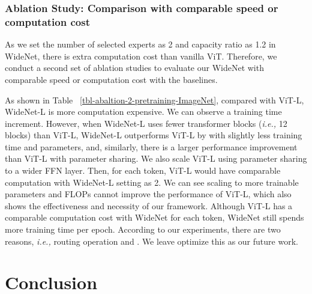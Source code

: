 \documentclass[letterpaper]{article} \usepackage{aaai22}  \usepackage{times}  \usepackage{helvet}  \usepackage{courier}  \usepackage[hyphens]{url}  \usepackage{graphicx} \urlstyle{rm} \def\UrlFont{\rm}  \usepackage{natbib}  \usepackage{caption} \DeclareCaptionStyle{ruled}{labelfont=normalfont,labelsep=colon,strut=off} \frenchspacing  \setlength{\pdfpagewidth}{8.5in}  \setlength{\pdfpageheight}{11in}  \usepackage{algorithm}
\newcommand{\ie}{\emph{i.e.,}\xspace}
\begin{document}
\subsubsection{Ablation Study: Comparison with comparable speed or computation cost}
As we set the number of selected experts  as 2 and capacity ratio  as 1.2 in WideNet, there is extra computation cost than vanilla ViT. Therefore, we conduct a second set of ablation studies to evaluate our WideNet with comparable speed or computation cost with the baselines.  

As shown in Table ~\ref{tbl-abaltion-2-pretraining-ImageNet}, compared with ViT-L, WideNet-L is more computation expensive. We can observe a training time increment. However, when WideNet-L uses fewer transformer blocks (\ie 12 blocks) than ViT-L, WideNet-L outperforms ViT-L by  with slightly less training time and  parameters, and, similarly, there is a larger performance improvement than ViT-L with parameter sharing. We also scale ViT-L using parameter sharing to a wider FFN layer. Then, for each token, ViT-L would have comparable computation with WideNet-L setting  as 2. We can see scaling to more trainable parameters and FLOPs cannot improve the performance of ViT-L, which also shows the effectiveness and necessity of our framework. Although ViT-L has a comparable computation cost with WideNet for each token, WideNet still spends more training time per epoch. According to our experiments, there are two reasons, \ie routing operation and . We leave optimize this as our future work.

























\section{Conclusion}
\end{document}
